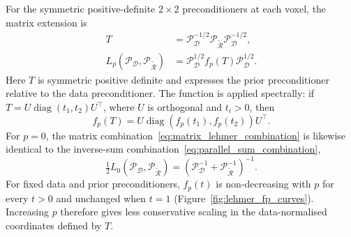 For the symmetric positive-definite $2\times2$ preconditioners at each voxel, the matrix extension is
\begin{equation}
    \begin{aligned}
        T
        &=\mathcal{P}_{\mathcal D}^{-1/2}\mathcal{P}_{\widetilde{\mathcal R}}\mathcal{P}_{\mathcal D}^{-1/2},
        \\
        L_p(\mathcal{P}_{\mathcal D},\mathcal{P}_{\widetilde{\mathcal R}})
        &=\mathcal{P}_{\mathcal D}^{1/2}f_p(T)\mathcal{P}_{\mathcal D}^{1/2}.
    \end{aligned}
    \label{eq:matrix_lehmer_combination}
\end{equation}
Here $T$ is symmetric positive definite and expresses the prior preconditioner relative to the data preconditioner. The function is applied spectrally: if $T=U\operatorname{diag}(t_1,t_2)U^\top$, where $U$ is orthogonal and $t_i>0$, then
\[
    f_p(T)
    =
    U\operatorname{diag}\!\left(f_p(t_1),f_p(t_2)\right)U^\top.
\]
For $p=0$, the matrix combination~\eqref{eq:matrix_lehmer_combination} is likewise identical to the inverse-sum combination~\eqref{eq:parallel_sum_combination},
\begin{equation}
    \tfrac12L_0(\mathcal{P}_{\mathcal D},\mathcal{P}_{\widetilde{\mathcal R}})
    =
    \left(\mathcal{P}_{\mathcal D}^{-1}+\mathcal{P}_{\widetilde{\mathcal R}}^{-1}\right)^{-1}.
    \label{eq:lehmer_parallel_equivalence}
\end{equation}
For fixed data and prior preconditioners, $f_p(t)$ is non-decreasing with $p$ for every $t>0$ and unchanged when $t=1$ (Figure~\ref{fig:lehmer_fp_curves}). Increasing $p$ therefore gives less conservative scaling in the data-normalised coordinates defined by $T$.

